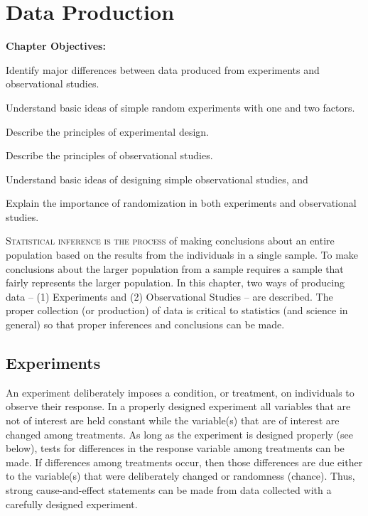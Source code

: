 \documentclass[10pt,openany]{book}\usepackage[]{graphicx}\usepackage[]{color}
\begin{document}
\chapter{Data Production} \label{chap:DataProd}
\begin{ChapObj}{\boxwidth}
  \textbf{Chapter Objectives:}
  \begin{Enumerate}
    \item Identify major differences between data produced from experiments and observational studies.
    \item Understand basic ideas of simple random experiments with one and two factors.
    \item Describe the principles of experimental design.
    \item Describe the principles of observational studies.
    \item Understand basic ideas of designing simple observational studies, and
    \item Explain the importance of randomization in both experiments and observational studies.
  \end{Enumerate}
\end{ChapObj}

\minitoc
\newpage

\lettrine{S}{tatistical inference is the process} of making conclusions about an entire population based on the results from the individuals in a single sample.  To make conclusions about the larger population from a sample requires a sample that fairly represents the larger population.  In this chapter, two ways of producing data -- (1) Experiments and (2) Observational Studies -- are described.  The proper collection (or production) of data is critical to statistics (and science in general) so that proper inferences and conclusions can be made.




\section{Experiments}
An experiment deliberately imposes a condition, or treatment, on individuals to observe their response.  In a properly designed experiment all variables that are not of interest are held constant while the variable(s) that are of interest are changed among treatments.  As long as the experiment is designed properly (see below), tests for differences in the response variable among treatments can be made.  If differences among treatments occur, then those differences are due either to the variable(s) that were deliberately changed or randomness (chance).  Thus, strong cause-and-effect statements can be made from data collected with a carefully designed experiment.
\end{document}
